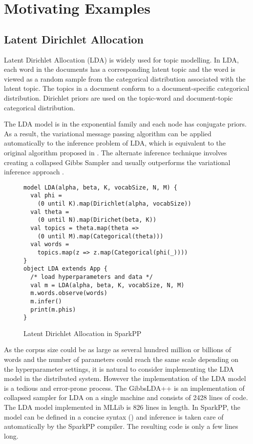 \section{Motivating Examples}
\label{sec:motivate}

\subsection{Latent Dirichlet Allocation}

Latent Dirichlet Allocation (LDA) is widely used for topic modelling. In LDA,
each word in the documents has a corresponding latent topic and the word is
viewed as a random sample from the categorical distribution associated with
the latent topic. The topics in a document conform to a document-specific
categorical distribution. Dirichlet priors are used on the topic-word and
document-topic categorical distribution. 

The LDA model is in the exponential family and each node has conjugate priors.
As a result, the variational message passing algorithm can be applied
automatically to the inference problem of LDA, which is equivalent to the
original algorithm proposed in \cite{blei2003latent}. The alternate inference
technique involves creating a collapsed Gibbs Sampler
\cite{griffiths2004finding} and usually outperforms the variational
inference approach .

\begin{figure}[!h]
\footnotesize
\begin{verbatim}
model LDA(alpha, beta, K, vocabSize, N, M) {
  val phi = 
    (0 until K).map(Dirichlet(alpha, vocabSize))
  val theta = 
    (0 until N).map(Dirichet(beta, K))
  val topics = theta.map(theta => 
    (0 until M).map(Categorical(theta)))
  val words = 
    topics.map(z => z.map(Categorical(phi(_))))
}
object LDA extends App {
  /* load hyperparameters and data */
  val m = LDA(alpha, beta, K, vocabSize, N, M)
  m.words.observe(words)
  m.infer()
  print(m.phis)
}
\end{verbatim}
\caption{Latent Dirichlet Allocation in SparkPP}
\label{fig:lda_sparkpp}
\end{figure}


As the corpus size could be as large as several hundred million or billions of
words and the number of parameters could reach the same scale depending on the
hyperparameter settings, it is natural to consider implementing the LDA model
in the distributed system. However the implementation of the LDA model is a
tedious and error-prone process. The GibbsLDA++ is an implementation of
collapsed sampler for LDA on a single machine \cite{gibbslda++} and consists
of 2428 lines of code. The LDA model implemented in MLLib is 826 lines in
length. In SparkPP, the model can be defined in a concise syntax
() and inference is taken care of automatically by the
SparkPP compiler. The resulting code is only a few lines long.

